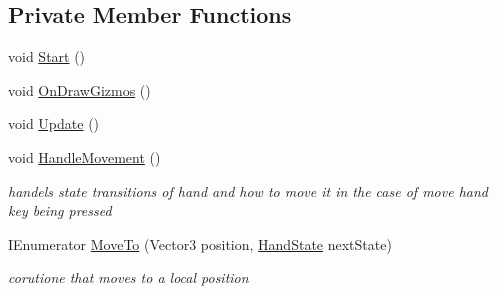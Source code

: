 \subsection*{Private Member Functions}
\begin{DoxyCompactItemize}
\item 
void \mbox{\hyperlink{class_p_c_player_hand_aa3eed40e80c66f9e85905cf2c2c4fcbe}{Start}} ()
\item 
void \mbox{\hyperlink{class_p_c_player_hand_a40a567183ee039605d5778060e5ce17a}{On\+Draw\+Gizmos}} ()
\item 
void \mbox{\hyperlink{class_p_c_player_hand_a1fec11a83fbd674a2a0ff6790704a847}{Update}} ()
\item 
void \mbox{\hyperlink{class_p_c_player_hand_a81d7137403650fb8da125b6356d50496}{Handle\+Movement}} ()
\begin{DoxyCompactList}\small\item\em handels state transitions of hand and how to move it in the case of move hand key being pressed \end{DoxyCompactList}\item 
I\+Enumerator \mbox{\hyperlink{class_p_c_player_hand_a338f6e5898a4953d48c046354ffef9e2}{Move\+To}} (Vector3 position, \mbox{\hyperlink{class_player_hand_a1af76750da713cbc88856161d8d5ac0e}{Hand\+State}} next\+State)
\begin{DoxyCompactList}\small\item\em corutione that moves to a local position \end{DoxyCompactList}\end{DoxyCompactItemize}
